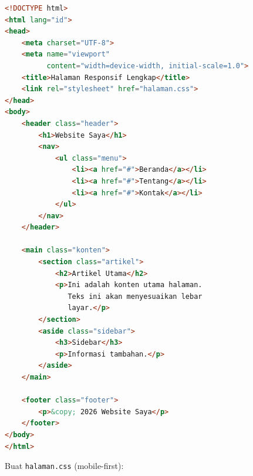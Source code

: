 \begin{lstlisting}[language=HTML, caption={Struktur halaman.html}, label={lst:halaman-html}]
<!DOCTYPE html>
<html lang="id">
<head>
    <meta charset="UTF-8">
    <meta name="viewport"
          content="width=device-width, initial-scale=1.0">
    <title>Halaman Responsif Lengkap</title>
    <link rel="stylesheet" href="halaman.css">
</head>
<body>
    <header class="header">
        <h1>Website Saya</h1>
        <nav>
            <ul class="menu">
                <li><a href="#">Beranda</a></li>
                <li><a href="#">Tentang</a></li>
                <li><a href="#">Kontak</a></li>
            </ul>
        </nav>
    </header>

    <main class="konten">
        <section class="artikel">
            <h2>Artikel Utama</h2>
            <p>Ini adalah konten utama halaman.
               Teks ini akan menyesuaikan lebar
               layar.</p>
        </section>
        <aside class="sidebar">
            <h3>Sidebar</h3>
            <p>Informasi tambahan.</p>
        </aside>
    </main>

    <footer class="footer">
        <p>&copy; 2026 Website Saya</p>
    </footer>
</body>
</html>
\end{lstlisting}

\begin{langkah}
  \item Buat \texttt{halaman.css} (mobile-first):
\end{langkah}

